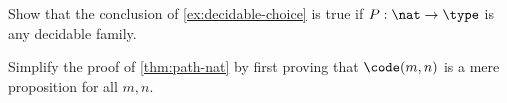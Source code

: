 \begin{ex}\label{ex:decidable-choice-strong}
  Show that the conclusion of \cref{ex:decidable-choice} is true if $P:\nat\to\type$ is any decidable family.
\end{ex}

\begin{ex}\label{ex:n-set}
  Simplify the proof of \cref{thm:path-nat} by first proving that $\code(m,n)$ is a mere proposition for all $m,n$.
\end{ex}

